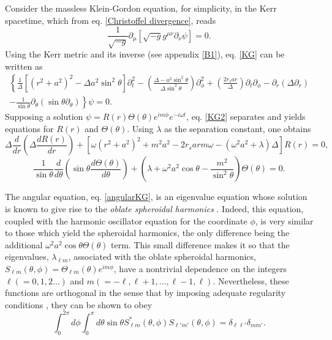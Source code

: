 \documentclass[
12pt,		%
openright,	%
twoside,  %
a4paper,			%
chapter=TITLE,		%
english,			%
french,				%
spanish,			%
brazil				%
]{USPSC-classe/USPSC}
\begin{document}
Consider the massless Klein-Gordon equation, for simplicity, in the Kerr spacetime, which from eq. \ref{Christoffel divergence}, reads
\begin{equation}\label{KG}
    \frac{1}{\sqrt{-g}}\partial_{\mu}\left[\sqrt{-g}g^{\mu\nu}\partial_{\nu}\psi\right]=0.
\end{equation}
 Using the Kerr metric and its inverse (see appendix \ref{B1}), eq. \ref{KG} can be written as
\begin{multline}\label{KG2}
\left\{\frac{1}{\Delta}\left[(r^2+a^2)^2-\Delta a^2\sin^2{\theta}\right]\partial^2_t-\left(\frac{\Delta-a^2\sin^2{\theta}}{\Delta\sin^2{\theta}}\right)\partial^2_{\phi}+\left(\frac{2r_sar}{\Delta}\right)\partial_t\partial_{\phi}-\partial_r(\Delta\partial_r)\right.\\ \left.-\frac{1}{\sin{\theta}}\partial_{\theta}\left(\sin{\theta}\partial_{\theta}\right)\right\}\psi=0.
\end{multline}
Supposing a solution $\psi=R(r)\Theta(\theta)e^{im\phi}e^{-i\omega t}$, eq. \ref{KG2} separates and yields equations for $R(r)$ and $\Theta(\theta)$. Using $\lambda$ as the separation constant, one obtains
\begin{equation}\label{radialKG}
    \Delta\frac{d}{dr}\left(\Delta\frac{dR(r)}{dr}\right)+\left[\omega(r^2+a^2)^2+m^2a^2-2r_sarm\omega-(\omega^2a^2+\lambda)\Delta\right]R(r)=0,
\end{equation}
\begin{equation}\label{angularKG}
\frac{1}{\sin{\theta}}\frac{d}{d\theta}\left(\sin{\theta}\frac{d\Theta(\theta)}{d\theta}\right)+\left(\lambda+\omega^2a^2\cos{\theta}-\frac{m^2}{\sin^2{\theta}}\right)\Theta(\theta)=0.
\end{equation}

The angular equation, eq. \ref{angularKG}, is an eigenvalue equation whose solution is known to give rise to the \textit{oblate spheroidal harmonics} \cite{Ford1975}. Indeed, this equation, coupled with the harmonic oscillator equation for the coordinate $\phi$, is very similar to those which yield the spheroidal harmonics, the only difference being the additional $\omega^2a^2\cos{\theta}\Theta(\theta)$ term. This small difference makes it so that the eigenvalues, $\lambda_{\ell m}$, associated with the oblate spheroidal harmonics, $S_{\ell m}(\theta,\phi)=\Theta_{\ell m}(\theta)e^{im\phi}$, have a nontrivial dependence on the integers $\ell(=0,1,2\ldots)$ and $m(=-\ell,\ell+1,\ldots,\ell-1,\ell)$. Nevertheless, these functions are orthogonal \cite{Iyer1979} in the sense that by imposing adequate regularity conditions \cite{Frolov2011}, they can be shown to obey 
\begin{equation}
    \int^{2\pi}_0 d\phi\int^{\pi}_0 d\theta  \sin{\theta}S^*_{\ell m}(\theta,\phi) S_{\ell' m'}(\theta,\phi)=\delta_{\ell\ell'}\delta_{mm'}.
\end{equation}
\end{document}
